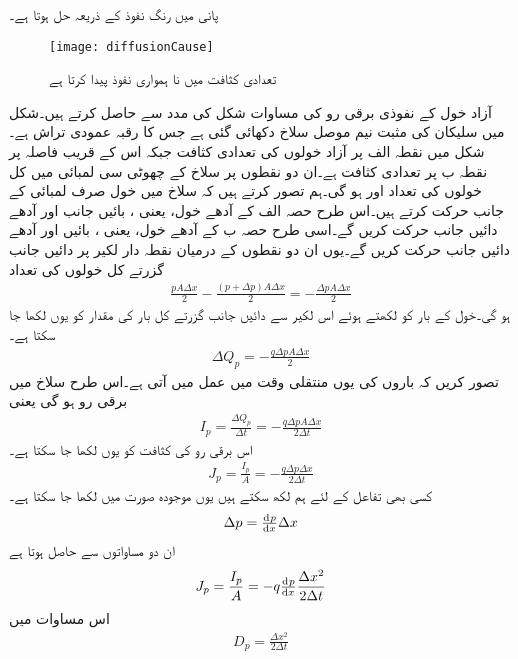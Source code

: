 پانی میں رنگ نفوذ کے ذریعہ حل ہوتا ہے۔
\begin{figure}
\centering
\texttt{[image: diffusionCause]}
\caption{ تعدادی کثافت میں نا ہمواری نفوذ پیدا کرتا ہے}
\label{شکل_نفوذ}
\end{figure}
آزاد خول کے نفوذی برقی رو کی مساوات شکل   کی مدد سے حاصل کرتے ہیں۔شکل میں سلیکان کی مثبت نیم موصل سلاخ دکھائی گئی ہے جس کا رقبہ عمودی تراش  ہے۔شکل میں نقطہ  الف پر آزاد خولوں کی تعدادی کثافت   جبکہ اس کے قریب   فاصلہ پر نقطہ  ب پر تعدادی کثافت  ہے۔ان دو نقطوں پر سلاخ کے چھوٹی سی لمبائی  میں کل خولوں کی تعداد   اور  ہو گی۔ہم تصور کرتے ہیں کہ سلاخ میں خول صرف لمبائی کے جانب حرکت کرتے ہیں۔اس طرح حصہ  الف کے آدھے خول، یعنی ،  بائیں جانب اور آدھے دائیں جانب حرکت کریں گے۔اسی طرح حصہ  ب کے آدھے خول، یعنی  ، بائیں اور آدھے دائیں جانب حرکت کریں گے۔یوں ان دو نقطوں کے درمیان نقطہ دار لکیر پر دائیں جانب گزرتے کل خولوں کی تعداد
\begin{align*}
\frac{p A \Delta x}{2}-\frac{(p+\Delta p ) A \Delta x}{2}=-\frac{\Delta p A \Delta x}{2}
\end{align*}
 ہو گی۔خول کے بار کو  لکھتے ہوئے اس لکیر سے دائیں جانب گزرتے کل بار کی مقدار کو یوں لکھا جا سکتا ہے۔
\begin{align*}
\Delta Q_p = -\frac{q \Delta p A \Delta x}{2}
\end{align*}
	تصور کریں کہ باروں کی یوں منتقلی وقت   میں عمل میں آتی ہے۔اس طرح سلاخ میں برقی رو ہو گی یعنی
\begin{align*}
I_p=\frac{\Delta Q_p}{\Delta t} = -\frac{q \Delta p A \Delta x}{2 \Delta t}
\end{align*}
اس برقی رو کی کثافت  کو یوں لکھا جا سکتا ہے۔
\begin{align}
J_p=\frac{I_p}{A} = -\frac{q \Delta p \Delta x}{2 \Delta t}
\end{align}
کسی بھی تفاعل   کے لئے ہم لکھ سکتے ہیں
یوں موجودہ صورت میں لکھا جا سکتا ہے۔
\begin{align}
\Delta p = \od{p}{x} \Delta x
\end{align}
ان دو مساواتوں سے حاصل ہوتا ہے
\begin{align}
J_p = \frac{I_p}{A}=-q \od{p}{x} \frac{\Delta x^2}{2 \Delta t}
\end{align}
اس مساوات میں
\begin{align}
D_p = \frac{\Delta x^2}{2 \Delta t}
\end{align}
